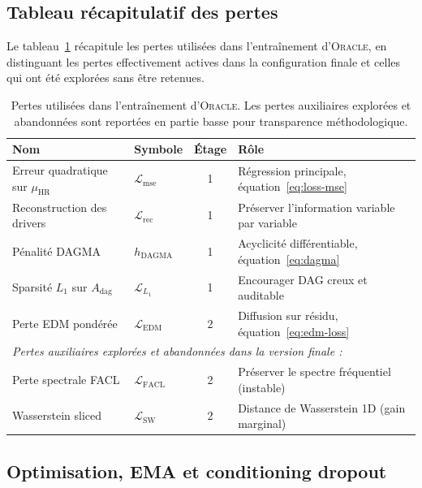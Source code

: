 \documentclass[14pt,a4paper,openany]{extreport}
\theoremstyle{definition}
\newcommand{\Oracle}{\textsc{Oracle}}
\newcommand{\HR}{\ensuremath{\text{HR}}}
\newcommand{\muHR}{\ensuremath{\mu_{\HR}}}
\newcommand{\Adag}{\ensuremath{A_{\mathrm{dag}}}}
\newcommand{\Lmse}{\ensuremath{\mathcal{L}_{\mathrm{mse}}}}
\newcommand{\Lrec}{\ensuremath{\mathcal{L}_{\mathrm{rec}}}}
\newcommand{\LLone}{\ensuremath{\mathcal{L}_{L_1}}}
\newcommand{\LEDM}{\ensuremath{\mathcal{L}_{\mathrm{EDM}}}}
\begin{document}
\subsection{Tableau récapitulatif des pertes}
\label{ssec:oracle-tab-pertes}

Le tableau~\ref{tab:pertes-oracle} récapitule les pertes utilisées dans l'entraînement d'\Oracle{}, en distinguant les pertes effectivement actives dans la configuration finale et celles qui ont été explorées sans être retenues.

\begin{table}[ht]
  \centering
  \small
  \caption{Pertes utilisées dans l'entraînement d'\Oracle{}. Les pertes auxiliaires explorées et abandonnées sont reportées en partie basse pour transparence méthodologique.}
  \label{tab:pertes-oracle}
  \begin{tabularx}{\linewidth}{l l c X}
    \toprule
    \textbf{Nom} & \textbf{Symbole} & \textbf{Étage} & \textbf{Rôle} \\
    \midrule
    Erreur quadratique sur $\muHR$ & $\Lmse$ & 1 & Régression principale, équation~\ref{eq:loss-mse}\\
    Reconstruction des drivers & $\Lrec$ & 1 & Préserver l'information variable par variable\\
    Pénalité DAGMA & $h_{\mathrm{DAGMA}}$ & 1 & Acyclicité différentiable, équation~\ref{eq:dagma}\\
    Sparsité $L_1$ sur $\Adag$ & $\LLone$ & 1 & Encourager DAG creux et auditable\\
    Perte EDM pondérée & $\LEDM$ & 2 & Diffusion sur résidu, équation~\ref{eq:edm-loss}\\
    \midrule
    \multicolumn{4}{l}{\textit{Pertes auxiliaires explorées et abandonnées dans la version finale :}}\\
    Perte spectrale FACL & $\mathcal{L}_{\mathrm{FACL}}$ & 2 & Préserver le spectre fréquentiel (instable)\\
    Wasserstein sliced & $\mathcal{L}_{\mathrm{SW}}$ & 2 & Distance de Wasserstein 1D (gain marginal)\\
    \bottomrule
  \end{tabularx}
\end{table}

\subsection{Optimisation, EMA et conditioning dropout}
\label{ssec:oracle-optim}
\end{document}
